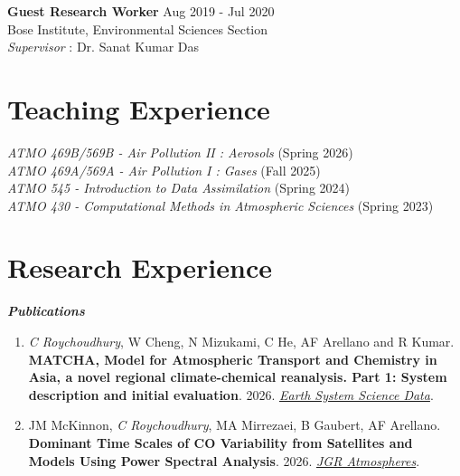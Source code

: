 \documentclass[margin,line]{resume}
\begin{document}
\begin{resume}
		\textbf{Guest Research Worker} \hfill Aug 2019 - Jul 2020 \\
		Bose Institute, Environmental Sciences Section \\
		\textit{Supervisor} : Dr. Sanat Kumar Das 
	
		
		\vspace*{-3mm}    
	
		
			\section{\mysidestyle \textbf{\textcolor{sep}{Teaching Experience}}}
		\textit{ATMO 469B/569B - Air Pollution II : Aerosols} (Spring 2026) \\
		\textit{ATMO 469A/569A - Air Pollution I : Gases} (Fall 2025) \\
		\textit{ATMO 545 - Introduction to Data Assimilation} (Spring 2024) \\
		\textit{ATMO 430 - Computational Methods in Atmospheric Sciences} (Spring 2023)
		
		\vspace{-0.4cm}
		
		\section{\mysidestyle \textbf{\textcolor{sep}{Research Experience}}}
		
	
		\textbf{\emph{\textcolor{sep}{Publications}}}
		\begin{enumerate}[topsep=1pt, partopsep=1pt, itemsep=0.5pt, parsep=0.1pt, leftmargin=15pt,label=\arabic*.]
			
			\item \textit{C Roychoudhury}, W Cheng, N Mizukami, C He, AF Arellano and R Kumar. \textbf{MATCHA, Model for Atmospheric Transport and Chemistry in Asia, a novel regional climate-chemical reanalysis. Part 1: System description and initial evaluation}. 2026.  \textit{\href{https://essd.copernicus.org/articles/18/5209/2026/}{Earth System Science Data}}.
			
			\item JM McKinnon, \textit{C Roychoudhury}, MA Mirrezaei, B Gaubert, AF Arellano.  \textbf{Dominant Time Scales of CO Variability from Satellites and Models Using Power Spectral Analysis}. 2026.  \textit{\href{https://doi.org/10.1029/2025JD045888}{JGR Atmospheres}}.
			

\end{enumerate}
\end{resume}
\end{document}

